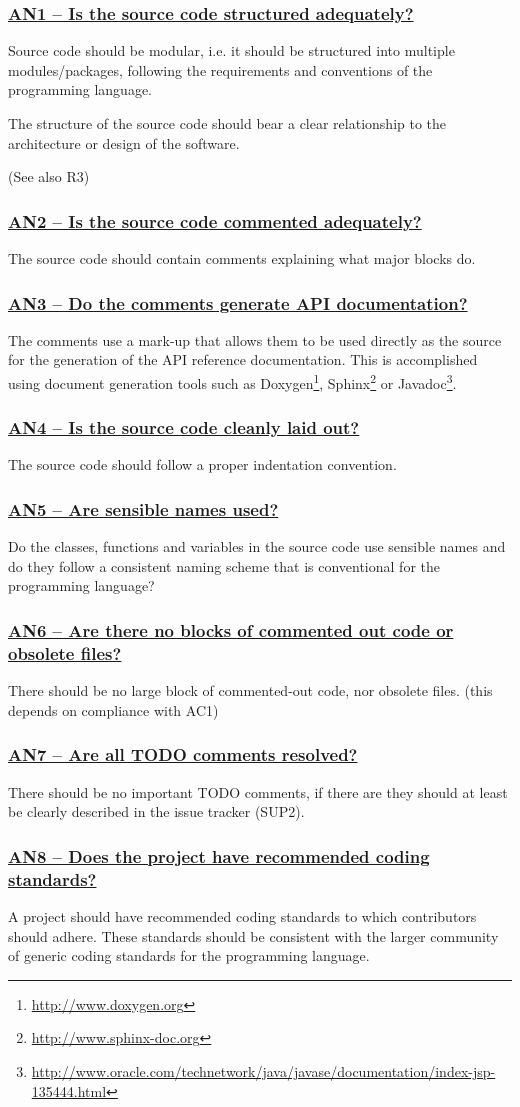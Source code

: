 \documentclass[a4paper,11pt]{article}
\newcommand{\indicator}[1]{\subsubsection*{\underline{#1}}}
\begin{document}
\indicator{AN1 -- Is the source code structured adequately?}

Source code should be modular, i.e. it should be structured into multiple
modules/packages, following the requirements and conventions of the programming
language. 

The structure of the source code should bear a clear relationship to the
architecture or design of the software.

(See also R3)

\indicator{AN2 -- Is the source code commented adequately?}

The source code should contain comments explaining what major blocks do.

\indicator{AN3 -- Do the comments generate API documentation?}

The comments use a mark-up that allows them to be used directly as the
source for the generation of the API reference documentation. This is
accomplished using document generation tools such as Doxygen\footnote{\url{http://www.doxygen.org}}, Sphinx\footnote{\url{http://www.sphinx-doc.org}} or
Javadoc\footnote{\url{http://www.oracle.com/technetwork/java/javase/documentation/index-jsp-135444.html}}.

\indicator{AN4 -- Is the source code cleanly laid out?}

The source code should follow a proper indentation convention. 

\indicator{AN5 -- Are sensible names used?}

Do the classes, functions and variables in the source code use sensible names
and do they follow a consistent naming scheme that is conventional for the
programming language?

\indicator{AN6 -- Are there no blocks of commented out code or obsolete files?}

There should be no large block of commented-out code, nor obsolete files.
(this depends on compliance with AC1)

\indicator{AN7 -- Are all TODO comments resolved?}

There should be no important TODO comments, if there are they should at least be
clearly described in the issue tracker (SUP2).

\indicator{AN8 -- Does the project have recommended coding standards?}

A project should have recommended coding standards to which contributors
should adhere. These standards should be consistent with the larger community
of generic coding standards for the programming language.
\end{document}
